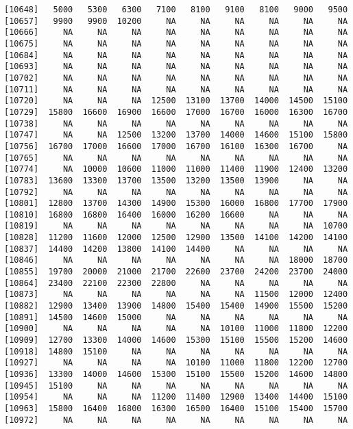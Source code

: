 \documentclass[]{article}
\begin{document}
\begin{verbatim}
[10648]   5000   5300   6300   7100   8100   9100   8100   9000   9500
[10657]   9900   9900  10200     NA     NA     NA     NA     NA     NA
[10666]     NA     NA     NA     NA     NA     NA     NA     NA     NA
[10675]     NA     NA     NA     NA     NA     NA     NA     NA     NA
[10684]     NA     NA     NA     NA     NA     NA     NA     NA     NA
[10693]     NA     NA     NA     NA     NA     NA     NA     NA     NA
[10702]     NA     NA     NA     NA     NA     NA     NA     NA     NA
[10711]     NA     NA     NA     NA     NA     NA     NA     NA     NA
[10720]     NA     NA     NA  12500  13100  13700  14000  14500  15100
[10729]  15800  16600  16900  16600  17000  16700  16000  16300  16700
[10738]     NA     NA     NA     NA     NA     NA     NA     NA     NA
[10747]     NA     NA  12500  13200  13700  14000  14600  15100  15800
[10756]  16700  17000  16600  17000  16700  16100  16300  16700     NA
[10765]     NA     NA     NA     NA     NA     NA     NA     NA     NA
[10774]     NA  10000  10600  11000  11000  11400  11900  12400  13200
[10783]  13600  13300  13700  13500  13200  13500  13900     NA     NA
[10792]     NA     NA     NA     NA     NA     NA     NA     NA     NA
[10801]  12800  13700  14300  14900  15300  16000  16800  17700  17900
[10810]  16800  16800  16400  16000  16200  16600     NA     NA     NA
[10819]     NA     NA     NA     NA     NA     NA     NA     NA  10700
[10828]  11200  11600  12000  12500  12900  13500  14100  14200  14100
[10837]  14400  14200  13800  14100  14400     NA     NA     NA     NA
[10846]     NA     NA     NA     NA     NA     NA     NA  18000  18700
[10855]  19700  20000  21000  21700  22600  23700  24200  23700  24000
[10864]  23400  22100  22300  22800     NA     NA     NA     NA     NA
[10873]     NA     NA     NA     NA     NA     NA  11500  12000  12400
[10882]  12900  13400  13900  14800  15400  15400  14900  15500  15200
[10891]  14500  14600  15000     NA     NA     NA     NA     NA     NA
[10900]     NA     NA     NA     NA     NA  10100  11000  11800  12200
[10909]  12700  13300  14000  14600  15300  15100  15500  15200  14600
[10918]  14800  15100     NA     NA     NA     NA     NA     NA     NA
[10927]     NA     NA     NA     NA  10100  11000  11800  12200  12700
[10936]  13300  14000  14600  15300  15100  15500  15200  14600  14800
[10945]  15100     NA     NA     NA     NA     NA     NA     NA     NA
[10954]     NA     NA     NA  11200  11400  12900  13400  14400  15100
[10963]  15800  16400  16800  16300  16500  16400  15100  15400  15700
[10972]     NA     NA     NA     NA     NA     NA     NA     NA     NA

\end{verbatim}
\end{document}
